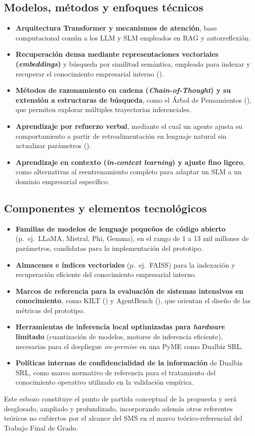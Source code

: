 \subsection{Modelos, métodos y enfoques técnicos}

\begin{itemize}
    \item \textbf{Arquitectura Transformer y mecanismos de atención}, base computacional común a los LLM y SLM empleados en RAG y autorreflexión.
    \item \textbf{Recuperación densa mediante representaciones vectoriales (\textit{embeddings})} y búsqueda por similitud semántica, empleada para indexar y recuperar el conocimiento empresarial interno (\cite{Karpukhin2020_DPR}).
    \item \textbf{Métodos de razonamiento en cadena (\textit{Chain-of-Thought}) y su extensión a estructuras de búsqueda}, como el Árbol de Pensamientos (\cite{Yao2023_ToT}), que permiten explorar múltiples trayectorias inferenciales.
    \item \textbf{Aprendizaje por refuerzo verbal}, mediante el cual un agente ajusta su comportamiento a partir de retroalimentación en lenguaje natural sin actualizar parámetros (\cite{Shinn2023_Reflexion}).
    \item \textbf{Aprendizaje en contexto (\textit{in-context learning}) y ajuste fino ligero}, como alternativas al reentrenamiento completo para adaptar un SLM a un dominio empresarial específico.
\end{itemize}

\subsection{Componentes y elementos tecnológicos}

\begin{itemize}
    \item \textbf{Familias de modelos de lenguaje pequeños de código abierto} (p.\ ej.\ LLaMA, Mistral, Phi, Gemma), en el rango de 1 a 13 mil millones de parámetros, candidatas para la implementación del prototipo.
    \item \textbf{Almacenes e índices vectoriales} (p.\ ej.\ FAISS) para la indexación y recuperación eficiente del conocimiento empresarial interno.
    \item \textbf{Marcos de referencia para la evaluación de sistemas intensivos en conocimiento}, como KILT (\cite{Petroni2021_KILT}) y AgentBench (\cite{Liu2024_AgentBench}), que orientan el diseño de las métricas del prototipo.
    \item \textbf{Herramientas de inferencia local optimizadas para \textit{hardware} limitado} (cuantización de modelos, motores de inferencia eficiente), necesarias para el despliegue \textit{on-premise} en una PyME como Dualbiz SRL.
    \item \textbf{Políticas internas de confidencialidad de la información} de Dualbiz SRL, como marco normativo de referencia para el tratamiento del conocimiento operativo utilizado en la validación empírica.
\end{itemize}

Este esbozo constituye el punto de partida conceptual de la propuesta y será desglosado, ampliado y profundizado, incorporando además otros referentes teóricos no cubiertos por el alcance del SMS en el marco teórico-referencial del Trabajo Final de Grado.

